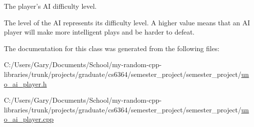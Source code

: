 \-The player's \-A\-I difficulty level. 

\-The level of the \-A\-I represents its difficulty level. \-A higher value means that an \-A\-I player will make more intelligent plays and be harder to defeat. 

\-The documentation for this class was generated from the following files\-:\begin{DoxyCompactItemize}
\item 
\-C\-:/\-Users/\-Gary/\-Documents/\-School/my-\/random-\/cpp-\/libraries/trunk/projects/graduate/cs6364/semester\-\_\-project/semester\-\_\-project/\hyperlink{uno__ai__player_8h}{uno\-\_\-ai\-\_\-player.\-h}\item 
\-C\-:/\-Users/\-Gary/\-Documents/\-School/my-\/random-\/cpp-\/libraries/trunk/projects/graduate/cs6364/semester\-\_\-project/semester\-\_\-project/\hyperlink{uno__ai__player_8cpp}{uno\-\_\-ai\-\_\-player.\-cpp}\end{DoxyCompactItemize}
